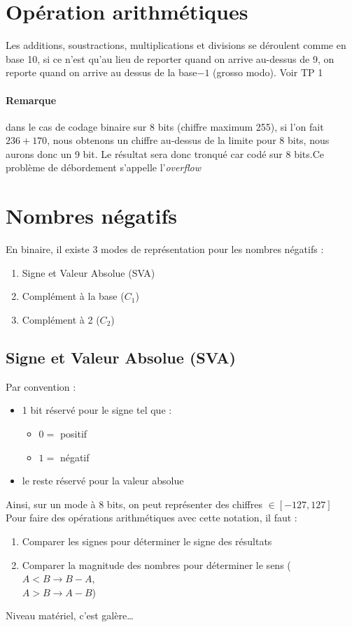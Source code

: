 \section{Opération arithmétiques}
Les additions, soustractions, multiplications et divisions se déroulent comme en base 10, si ce n'est qu'au lieu de reporter quand on arrive au-dessus de 9, on reporte quand on arrive au dessus de la base$-1$ (grosso modo). Voir TP 1
\paragraph{Remarque} dans le cas de codage binaire sur 8 bits (chiffre maximum 255), si l'on fait $236+170$, nous obtenons un chiffre au-dessus de la limite pour 8 bits, nous aurons donc un 9 bit. Le résultat sera donc tronqué car codé sur 8 bits.Ce problème de débordement s'appelle l'\textit{overflow}
\section{Nombres négatifs}
En binaire, il existe 3 modes de représentation pour les nombres négatifs :
\begin{enumerate}
	\item Signe et Valeur Absolue (SVA)
	\item Complément à la base ($C_1$)
	\item Complément à 2 ($C_2$)
\end{enumerate}
\subsection{Signe et Valeur Absolue (SVA)}
\label{subsec:sva}
Par convention :
\begin{itemize}
	\item 1 bit réservé pour le signe tel que :
	\begin{itemize}
		\item $0 =$ positif
		\item $1=$ négatif
	\end{itemize}
	\item le reste réservé pour la valeur absolue
\end{itemize}
Ainsi, sur un mode à 8 bits, on peut représenter des chiffres $\in [-127,127]$\\
Pour faire des opérations arithmétiques avec cette notation, il faut :
\begin{enumerate}
	\item Comparer les signes pour déterminer le signe des résultats
	\item Comparer la magnitude des nombres pour déterminer le sens ($A<B\rightarrow B-A$,\\ $A>B\rightarrow A-B$)
\end{enumerate}
Niveau matériel, c'est galère\dots
